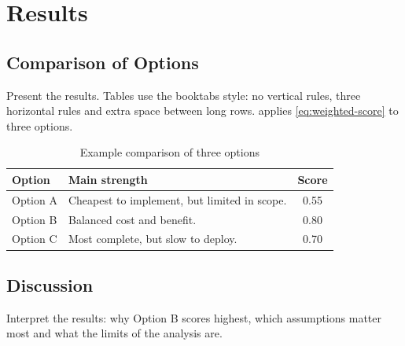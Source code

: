 \section{Results}\label{sec:results}

\subsection{Comparison of Options}\label{sec:comparison}
Present the results. Tables use the booktabs style: no vertical rules, three horizontal rules and extra space between long rows.  applies \cref{eq:weighted-score} to three options.

\begin{table}[H]
  \centering
  \caption{Example comparison of three options}\label{tab:comparison}
  \begin{tabularx}{\textwidth}{@{}P{3cm}LC@{}}
    \toprule
    \textbf{Option} & \textbf{Main strength} & \textbf{Score} \\
    \midrule
    Option A & Cheapest to implement, but limited in scope. & 0.55 \\
    \addlinespace
    Option B & Balanced cost and benefit. & 0.80 \\
    \addlinespace
    Option C & Most complete, but slow to deploy. & 0.70 \\
    \bottomrule
  \end{tabularx}
\end{table}

\subsection{Discussion}\label{sec:discussion}
Interpret the results: why Option B scores highest, which assumptions matter most and what the limits of the analysis are.%

